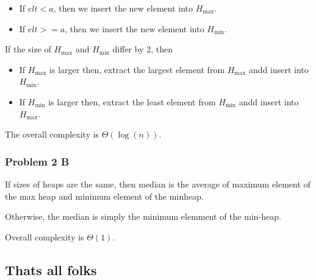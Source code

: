 \documentclass[
]{article}
\providecommand{\tightlist}{%
  \setlength{\itemsep}{0pt}\setlength{\parskip}{0pt}}
\begin{document}
\begin{itemize}
\tightlist
\item
  If \(elt < a\), then we insert the new element into \(H_{\max}\).
\item
  If \(elt >= a\), then we insert the new element into \(H_{\min}\).
\end{itemize}

If the size of \(H_{\max}\) and \(H_{\min}\) differ by 2, then

\begin{itemize}
\tightlist
\item
  If \(H_{\max}\) is larger then, extract the largest element from
  \(H_{\max}\) andd insert into \(H_{\min}\).
\item
  If \(H_{\min}\) is larger then, extract the least element from
  \(H_{\min}\) andd insert into \(H_{\max}\).
\end{itemize}

The overall complexity is \(\Theta(\log(n))\).

\hypertarget{problem-2-b}{%
\subsubsection{Problem 2 B}\label{problem-2-b}}

If sizes of heaps are the same, then median is the average of maximum
element of the max heap and minimum element of the minheap.

Otherwise, the median is simply the minimum elemment of the min-heap.

Overall complexity is \(\Theta(1)\).

\hypertarget{thats-all-folks}{%
\subsection{That\textquotesingle s all folks}\label{thats-all-folks}}
\end{document}
